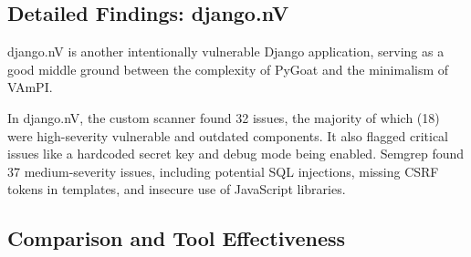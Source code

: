 \subsection{Detailed Findings: django.nV}

django.nV is another intentionally vulnerable Django application, serving as a good middle ground between the complexity of PyGoat and the minimalism of VAmPI.

\begin{table}[h!]
\centering
\caption{Vulnerabilities Identified in django.nV}
\label{tab:djangonv_vulns}
\end{table}

In django.nV, the custom scanner found 32 issues, the majority of which (18) were high-severity vulnerable and outdated components. It also flagged critical issues like a hardcoded secret key and debug mode being enabled. Semgrep found 37 medium-severity issues, including potential SQL injections, missing CSRF tokens in templates, and insecure use of JavaScript libraries.

\subsection{Comparison and Tool Effectiveness}

